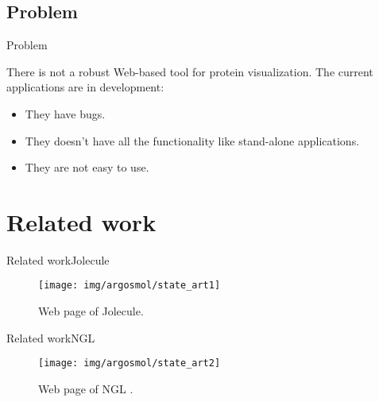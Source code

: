 \documentclass[10pt]{beamer}
\newcommand{\1}{
        	\setbeamertemplate{background}{
        		\texttt{[image: img/1]}
        		\tikz[overlay] \fill[fill opacity=0.75,fill=white] (0,0) rectangle (-\paperwidth,\paperheight);
        	}
}
\begin{document}
\subsection{Problem}
\begin{frame}{Problem}{}
	
\begin{block}{}
	There is not a robust Web-based tool for protein visualization. The current applications are in development:
	\begin{itemize}
		\item They have bugs.
		\item They doesn't have all the functionality like stand-alone applications. 
		\item They are not easy to use.
	\end{itemize}
\end{block}
	
\end{frame}


\section{Related work}

\begin{frame}{Related work}{Jolecule}	
	\begin{figure}
		\centering
		\texttt{[image: img/argosmol/state\_art1]}
		\caption{Web page of Jolecule.}
	\end{figure}
\end{frame}

\begin{frame}{Related work}{NGL}	
	\begin{figure}
		\centering
		\texttt{[image: img/argosmol/state\_art2]}
		\caption{Web page of NGL \cite{rose2015ngl}.}
	\end{figure}
\end{frame}
\end{document}
